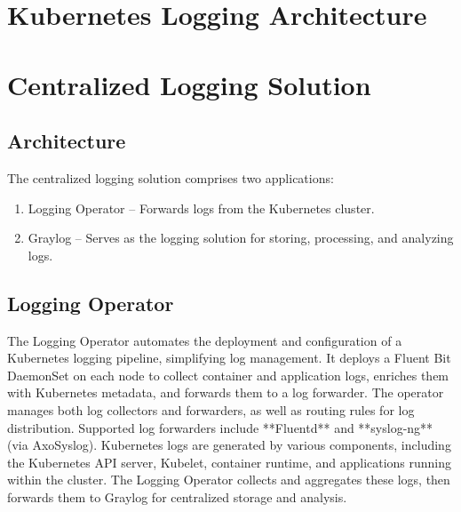 \documentclass[../main.tex]{subfiles}
\begin{document}
\section{Kubernetes Logging Architecture}

\cite{loggingkubernetes}

\section{Centralized Logging Solution}

\subsection{Architecture}
The centralized logging solution comprises two applications:

\begin{enumerate}
    \item Logging Operator – Forwards logs from the Kubernetes cluster. 
    \item Graylog – Serves as the logging solution for storing, processing, and analyzing logs.
\end{enumerate}

\subsection{Logging Operator}

The Logging Operator \cite{logoperator} automates the deployment and configuration of a Kubernetes logging pipeline, simplifying log management. It deploys a Fluent Bit DaemonSet 
on each node to collect container and application logs, enriches them with Kubernetes metadata, and forwards them to a log forwarder. The operator manages both log collectors and forwarders, as well as routing rules for log distribution. Supported log forwarders include **Fluentd** and **syslog-ng** (via AxoSyslog).
Kubernetes logs are generated by various components, including the Kubernetes API server, Kubelet, container runtime, and applications running within the cluster. The Logging Operator collects and aggregates these logs, then forwards them to Graylog for centralized storage and analysis.
\end{document}
